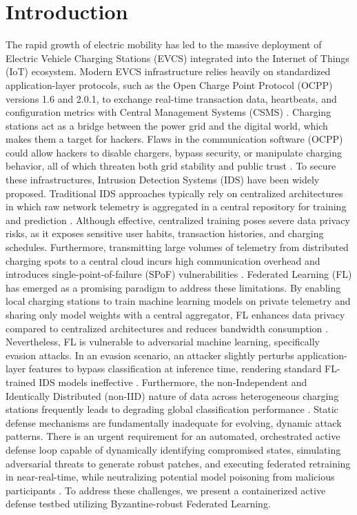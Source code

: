 \documentclass[10pt, a4paper, conference]{IEEEtran}
\begin{document}
\section{Introduction}
The rapid growth of electric mobility has led to the massive deployment of Electric Vehicle Charging Stations (EVCS) integrated into the Internet of Things (IoT) ecosystem. Modern EVCS infrastructure relies heavily on standardized application-layer protocols, such as the Open Charge Point Protocol (OCPP) versions 1.6 and 2.0.1, to exchange real-time transaction data, heartbeats, and configuration metrics with Central Management Systems (CSMS) \cite{Boussaha2025}. Charging stations act as a bridge between the power grid and the digital world, which makes them a target for hackers. Flaws in the communication software (OCPP) could allow hackers to disable chargers, bypass security, or manipulate charging behavior, all of which threaten both grid stability and public trust \cite{Kabir2026}.
To secure these infrastructures, Intrusion Detection Systems (IDS) have been widely proposed. Traditional IDS approaches typically rely on centralized architectures in which raw network telemetry is aggregated in a central repository for training and prediction \cite{Seo2025} . Although effective, centralized training poses severe data privacy risks, as it exposes sensitive user habits, transaction histories, and charging schedules. Furthermore, transmitting large volumes of telemetry from distributed charging spots to a central cloud incurs high communication overhead and introduces single-point-of-failure (SPoF) vulnerabilities   \cite{Nguyen2025}.
Federated Learning (FL) has emerged as a promising paradigm to address these limitations. By enabling local charging stations to train machine learning models on private telemetry and sharing only model weights with a central aggregator, FL enhances data privacy compared to centralized architectures and reduces bandwidth consumption \cite{Dalamagkas2025}.   Nevertheless, FL is vulnerable to adversarial machine learning, specifically evasion attacks. In an evasion scenario, an attacker slightly perturbs application-layer features to bypass classification at inference time, rendering standard FL-trained IDS models ineffective \cite{Dalamagkas2025}. Furthermore, the non-Independent and Identically Distributed (non-IID) nature of data across heterogeneous charging stations frequently leads to degrading global classification performance \cite{Fu2023}.
Static defense mechanisms are fundamentally inadequate for evolving, dynamic attack patterns. There is an urgent requirement for an automated, orchestrated active defense loop capable of dynamically identifying compromised states, simulating adversarial threats to generate robust patches, and executing federated retraining in near-real-time, while neutralizing potential model poisoning from malicious participants \cite{Hadi2026}. To address these challenges, we present a containerized active defense testbed utilizing Byzantine-robust Federated Learning.
\end{document}
